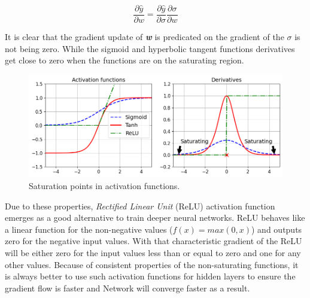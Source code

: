 \begin{equation} \label{eq:chain}
  \frac{\partial{\hat{y}}}{\partial{w}} = \frac{\partial{\hat{y}}}{\partial{\sigma}}  \frac{\partial{\sigma}}{\partial{w}}
\end{equation}

It is clear that the gradient update of \textbf{\textit{w}} is predicated on the gradient of the $\sigma$ is not being zero.
While the sigmoid and hyperbolic tangent functions derivatives get close to zero when the functions are on the saturating region. 

\begin{figure}[H]
  \centering
  \includegraphics[width=\textwidth]{img/activation_functions_plot.png}
  \caption{Saturation points in activation functions.}
  \label{fig:saturate}
\end{figure}

Due to these properties, \emph{Rectified Linear Unit} (ReLU) activation function emerges as a good alternative to train deeper neural networks.
ReLU behaves like a linear function for the non-negative values ($f(x) = max(0, x)$) and outputs zero for the negative input values.
With that characteristic gradient of the ReLU will be either zero for the input values less than or equal to zero and one for any other values.
Because of consistent properties of the non-saturating functions, it is always better to use such activation functions for hidden layers to ensure the gradient flow is faster and Network will converge faster as a result.

